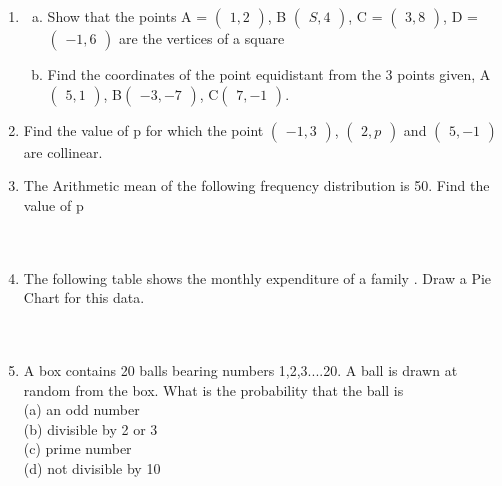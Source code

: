 \documentclass[journal,12pt,twocolumn]{IEEEtran}
\newcommand{\myvec}[1]{\ensuremath{\begin{pmatrix}#1\end{pmatrix}}}
\begin{document}
\begin{enumerate}[label=1.\arabic*]
\begin{enumerate}[label=2.\arabic*]
\item \begin{enumerate}[a)] 
    \item Show that the points A = \myvec{1,2}, B \myvec{S,4}, C = \myvec{3,8}, D = \myvec{-1,6} are the vertices of a square\\
    \item Find the coordinates of the point equidistant from the 3 points given, A\myvec{5,1}, B\myvec{-3, -7}, C\myvec{7,-1}.\\
\end{enumerate}
\item Find the value of p for which the point \myvec{-1,3}, \myvec{2,p} and \myvec{5,-1} are collinear. \\

\item The Arithmetic mean of the following frequency distribution is 50. Find the value of p\\
\vspace{1mm}\\
\vspace{1mm}\\
\item The following table shows the monthly expenditure of a family
. Draw a Pie Chart for this data.\\
\vspace{2mm}\\
\vspace{2mm}\\
\item A box contains 20 balls bearing numbers 1,2,3....20. A ball is drawn at random from the box. What is the probability that the ball is\\

(a) an odd number\\
(b) divisible by 2 or 3 \\
(c) prime number\\
(d) not divisible by 10\\


\end{enumerate}
\end{enumerate}
\end{document}
